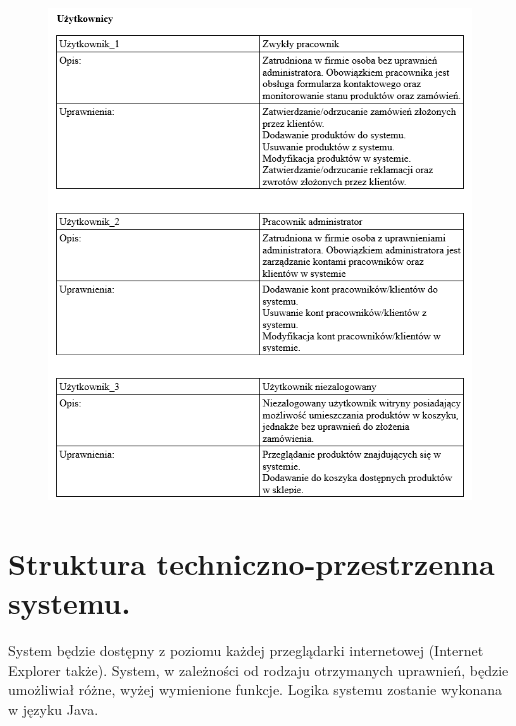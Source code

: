 \documentclass[a4paper,11pt]{article}
\begin{document}
\begin{figure}[H]
	\centering
		\includegraphics[width=1.1\textwidth]{pleaseDontJudgeME.png}
\end{figure}




\section {Struktura techniczno-przestrzenna systemu.}
System będzie dostępny z poziomu każdej przeglądarki internetowej (Internet Explorer także). System, w zależności od rodzaju otrzymanych uprawnień, będzie umożliwiał różne, wyżej wymienione funkcje. Logika systemu zostanie wykonana w języku Java. 
\end{document}
